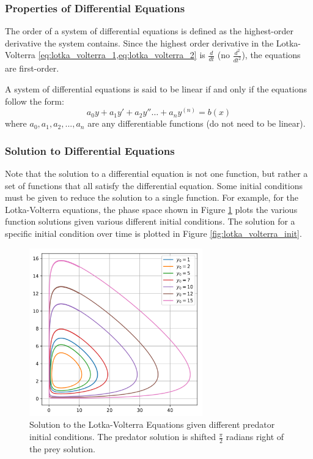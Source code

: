 \subsubsection{Properties of Differential Equations}
\label{subsubsection:properties_differential}
\begin{definition}
    The order of a system of differential equations is defined as the highest-order derivative the system contains. Since the highest order derivative in the Lotka-Volterra \cref{eq:lotka_volterra_1,eq:lotka_volterra_2} is $\frac{d}{dt}$ (no $\frac{d^2}{{dt}^2}$), the equations are first-order.
\end{definition}

\begin{definition}
    A system of differential equations is said to be linear if and only if the equations follow the form:
    \[ a_0 y + a_1 y' + a_2 y'' \dots + a_n y^{(n)} = b(x) \]
    \noindent
    where $a_0, a_1, a_2, ..., a_n$ are any differentiable functions (do not need to be linear).
\end{definition}

\subsubsection{Solution to Differential Equations}
Note that the solution to a differential equation is not one function, but rather a set of functions that all satisfy the differential equation. Some initial conditions must be given to reduce the solution to a single function. For example, for the Lotka-Volterra equations, the phase space shown in Figure \ref{fig:lotka_volterra_phase} plots the various function solutions given various different initial conditions. The solution for a specific initial condition over time is plotted in Figure \ref{fig:lotka_volterra_init}.

\begin{figure}[H]
    \centering
    \includegraphics[width=75mm,height=\textheight,keepaspectratio]{images/Predator_prey_dynamics.png}
    \caption{Solution to the Lotka-Volterra Equations given different predator initial conditions. The predator solution is shifted $\frac{\pi}{2}$ radians right of the prey solution.}
    \label{fig:lotka_volterra_phase}
\end{figure}

